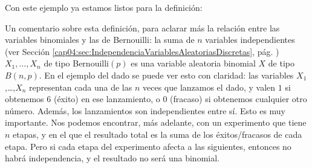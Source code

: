 Con este ejemplo ya estamos listos para la definición:
    \begin{center}
    \end{center}
Un comentario sobre esta definición, para aclarar más la relación entre las variables binomiales y las de Bernouilli: la suma de $n$ variables independientes (ver Sección \ref{cap04:sec:IndependenciaVariablesAleatoriasDiscretas}, pág. \pageref{cap04:sec:IndependenciaVariablesAleatoriasDiscretas}) $X_1,\ldots,X_n$ de tipo Bernouilli$(p)$ es una variable aleatoria binomial $X$ de tipo $B(n,p)$. En el ejemplo del dado se puede ver esto con claridad: las variables $X_1$,\ldots,$X_n$ representan cada una de las $n$ veces que lanzamos el dado, y valen $1$ si obtenemos $6$ (éxito) en ese lanzamiento, o $0$ (fracaso) si obtenemos cualquier otro número. Además, los lanzamientos son independientes entre sí. Esto es muy importante. Nos podemos encontrar, más adelante, con un experimento que tiene $n$ etapas, y en el que el resultado total es la suma de los éxitos/fracasos de cada etapa. Pero si cada etapa del experimento afecta a las siguientes, entonces no habrá independencia, y el resultado no será una binomial.
